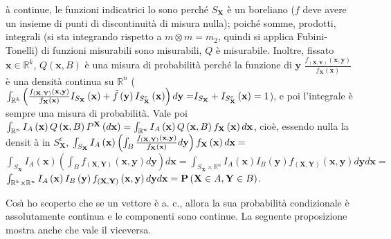 \documentclass{article}
\begin{document}
\begin{description}
\`{a} continue, le funzioni indicatrici lo sono perch\'{e} $S_{\mathbf{X}}$ 
\`{e} un boreliano ($f$ deve avere un insieme di punti di discontinuit\`{a}
di misura nulla); poich\'{e} somme, prodotti, integrali (si sta integrando
rispetto a $m\otimes m=m_{2}$, quindi si applica Fubini-Tonelli) di funzioni
misurabili sono misurabili, $Q$ \`{e} misurabile. Inoltre, fissato $\mathbf{x%
}\in 
\mathbb{R}
^{k}$, $Q\left( \mathbf{x},B\right) $ \`{e} una misura di probabilit\`{a}
perch\'{e} la funzione di $\mathbf{y}$ $\frac{f_{\left( \mathbf{X,Y}\right)
}\left( \mathbf{x,y}\right) }{f_{\mathbf{X}}\left( \mathbf{x}\right) }$ \`{e}
una densit\`{a} continua su $%
\mathbb{R}
^{n}$ ($\int_{%
\mathbb{R}
^{k}}\left( \frac{f_{\left( \mathbf{X,Y}\right) }\left( \mathbf{x,y}\right) 
}{f_{\mathbf{X}}\left( \mathbf{x}\right) }I_{S_{\mathbf{X}}}\left( \mathbf{x}%
\right) +\tilde{f}\left( \mathbf{y}\right) I_{S_{\mathbf{X}}^{c}}\left( 
\mathbf{x}\right) \right) d\mathbf{y=}I_{S_{\mathbf{X}}}+I_{S_{\mathbf{X}%
}^{c}}\left( \mathbf{x}\right) =1$), e poi l'integrale \`{e} sempre una
misura di probabilit\`{a}. Vale poi $\int_{%
\mathbb{R}
^{n}}I_{A}\left( \mathbf{x}\right) Q\left( \mathbf{x},B\right) P^{\mathbf{X}%
}\left( d\mathbf{x}\right) =\int_{%
\mathbb{R}
^{n}}I_{A}\left( \mathbf{x}\right) Q\left( \mathbf{x},B\right) f_{\mathbf{X}%
}\left( \mathbf{x}\right) d\mathbf{x}$, cio\`{e}, essendo nulla la densit%
\`{a} in $S_{\mathbf{X}}^{c}$, $\int_{S_{\mathbf{X}}}I_{A}\left( \mathbf{x}%
\right) \left( \int_{B}\frac{f_{\left( \mathbf{X,Y}\right) }\left( \mathbf{%
x,y}\right) }{f_{\mathbf{X}}\left( \mathbf{x}\right) }d\mathbf{y}\right) f_{%
\mathbf{X}}\left( \mathbf{x}\right) d\mathbf{x=}$ $\int_{S_{\mathbf{X}%
}}I_{A}\left( \mathbf{x}\right) \left( \int_{B}f_{\left( \mathbf{X,Y}\right)
}\left( \mathbf{x,y}\right) d\mathbf{y}\right) d\mathbf{x=}\int_{S_{\mathbf{X%
}}\times 
\mathbb{R}
^{n}}I_{A}\left( \mathbf{x}\right) I_{B}\left( \mathbf{y}\right) f_{\left( 
\mathbf{X,Y}\right) }\left( \mathbf{x,y}\right) d\mathbf{y}d\mathbf{x=}$ $%
\int_{%
\mathbb{R}
^{k}\times 
\mathbb{R}
^{n}}I_{A}\left( \mathbf{x}\right) I_{B}\left( \mathbf{y}\right) f_{\left( 
\mathbf{X,Y}\right) }\left( \mathbf{x,y}\right) d\mathbf{y}d\mathbf{x}=%
\mathbf{P}\left( \mathbf{X}\in A,\mathbf{Y}\in B\right) $.

\item Cos\`{\i} ho scoperto che se un vettore \`{e} a. c., allora la sua
probabilit\`{a} condizionale \`{e} assolutamente continua e le componenti
sono continue. La seguente proposizione mostra anche che vale il viceversa.
\end{description}
\end{document}
